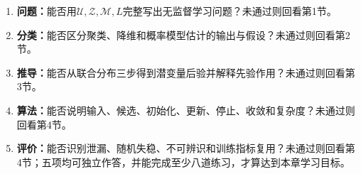 \begin{SLCompactClosure}
\label{struct:V4-C01-CH36}

\label{struct:V4-C01-CH37}
\begin{selfcheckbox}
\begin{enumerate}[leftmargin=2.2em]
  \item \textbf{问题：}能否用$\mathcal U,\mathcal Z,\mathcal M,L$完整写出无监督学习问题？未通过则回看第1节。
  \item \textbf{分类：}能否区分聚类、降维和概率模型估计的输出与假设？未通过则回看第2节。
  \item \textbf{推导：}能否从联合分布三步得到潜变量后验并解释先验作用？未通过则回看第3节。
  \item \textbf{算法：}能否说明输入、候选、初始化、更新、停止、收敛和复杂度？未通过则回看第4节。
  \item \textbf{评价：}能否识别泄漏、随机失稳、不可辨识和训练指标复用？未通过则回看第4节；五项均可独立作答，并能完成至少八道练习，才算达到本章学习目标。
\end{enumerate}
\end{selfcheckbox}
\end{SLCompactClosure}
